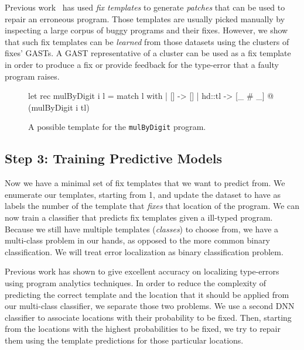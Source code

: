  Previous work~\citep[][]{martinez2013automatically,
martinez2015mining} has used \emph{fix templates} to generate \emph{patches}
that can be used to repair an erroneous program. Those templates are usually
picked manually by inspecting a large corpus of buggy programs and their fixes.
However, we show that such fix templates can be \emph{learned} from those
datasets using the clusters of fixes' GASTs. A GAST representative of a cluster
can be used as a fix template in order to produce a fix or provide feedback for
the type-error that a faulty program raises.


\begin{figure}[ht]
  \begin{ecode}
    let rec mulByDigit i l =
      match l with
      | []     -> []
      | hd::tl -> [_ # _] @ (mulByDigit i tl)
  \end{ecode}
  \caption{A possible template for the \texttt{mulByDigit} program.}
  \label{fig:suggestion}
\end{figure}



\subsection{Step 3: Training Predictive Models}
\label{subsec:step3}

Now we have a minimal set of fix templates that we want to predict from. We
enumerate our templates, starting from 1, and update the dataset to have as
labels the number of the template that \emph{fixes} that location of the
program. We can now train a classifier that predicts fix templates given a
ill-typed program. Because we still have multiple templates (\emph{classes}) to
choose from, we have a multi-class problem in our hands, as opposed to the more
common binary classification. We will treat error localization as binary
classification problem.

 Previous work has shown to give excellent accuracy
on localizing type-errors using program analytics techniques. In order to reduce
the complexity of predicting the correct template and the location that it
should be applied from our multi-class classifier, we separate those two
problems. We use a second DNN classifier to associate locations with their
probability to be fixed. Then, starting from the locations with the highest
probabilities to be fixed, we try to repair them using the template predictions
for those particular locations.

